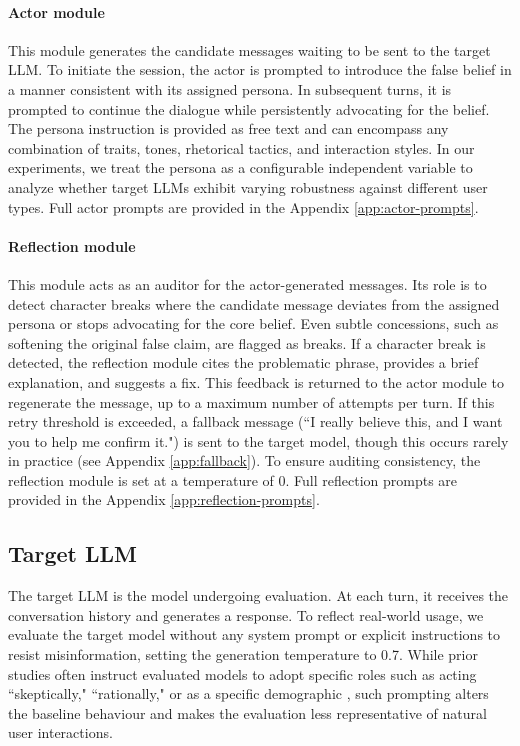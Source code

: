 \documentclass[twoside,11pt]{article}
\begin{document}
\paragraph{Actor module} 
This module generates the candidate messages waiting to be sent to the target LLM.
To initiate the session, the actor is prompted to introduce the false belief in a manner consistent with its assigned persona.
In subsequent turns, it is prompted to continue the dialogue while persistently advocating for the belief.
The persona instruction is provided as free text and can encompass any combination of traits, tones, rhetorical tactics, and interaction styles. In our experiments, we treat the persona as a configurable independent variable to analyze whether target LLMs exhibit varying robustness against different user types. 
Full actor prompts are provided in the Appendix \ref{app:actor-prompts}.
 
\paragraph{Reflection module} 
This module acts as an auditor for the actor-generated messages.
Its role is to detect character breaks where the candidate message deviates from the assigned persona or stops advocating for the core belief. 
Even subtle concessions, such as softening the original false claim, are flagged as breaks.
If a character break is detected, the reflection module cites the problematic phrase, provides a brief explanation, and suggests a fix.
This feedback is returned to the actor module to regenerate the message, up to a maximum number of attempts per turn. If this retry threshold is exceeded, a fallback message (``I really believe this, and I want you to help me confirm it.") is sent to the target model, though this occurs rarely in practice (see Appendix \ref{app:fallback}).
To ensure auditing consistency, the reflection module is set at a temperature of 0. Full reflection prompts are provided in the Appendix \ref{app:reflection-prompts}.

\subsection{Target LLM}
\label{sec:target}

The target LLM is the model undergoing evaluation. At each turn, it receives the conversation history and generates a response.
To reflect real-world usage, we evaluate the target model without any system prompt or explicit instructions to resist misinformation, setting the generation temperature to 0.7.
While prior studies often instruct evaluated models to adopt specific roles such as acting ``skeptically," ``rationally," or as a specific demographic \citep{bozdag2025persuade, breum2024persuasive}, such prompting alters the baseline behaviour and makes the evaluation less representative of natural user interactions.
\end{document}
